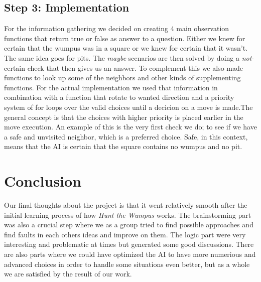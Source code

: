 \documentclass[a4paper,11pt]{article}
\begin{document}
\subsection{Step 3: Implementation} %
For the information gathering we decided on creating 4 main observation functions that return true or false as answer to a question. Either we knew for certain that the wumpus was in a square or we knew for certain that it wasn't. The same idea goes for pits. The \textit{maybe} scenarios are then solved by doing a \textit{not}-certain check that then gives us an answer. To complement this we also made functions to look up some of the neighbors and other kinds of supplementing functions.
For the actual implementation we used that information in combination with a function that rotate to wanted direction and a priority system of for loops over the valid choices until a decicion on a move is made.The general concept is that the choices with higher priority is placed earlier in the move execution. An example of this is the very first check we do; to see if we have a safe and unvisited neighbor, which is a preferred choice. Safe, in this context, means that the AI is certain that the square contains no wumpus and no pit.

\section{Conclusion}
Our final thoughts about the project is that it went relatively smooth after the initial learning process of how \textit{Hunt the Wumpus} works. The brainstorming part was also a crucial step where we as a group tried to find possible approaches and find faults in each others ideas and improve on them. The logic part were very interesting and problematic at times but generated some good discussions. There are also parts where we could have optimized the AI to have more numerious and advanced choices in order to handle some situations even better, but as a whole we are satisfied by the result of our work.
\end{document}
